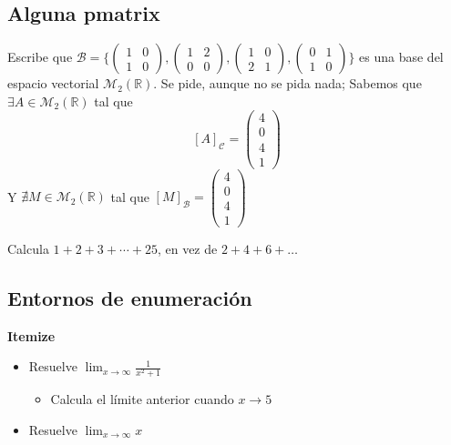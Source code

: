 \documentclass[10pt,a4paper]{article}
\begin{document}
\subsection{Alguna pmatrix}

Escribe que $\mathcal{B} = \{
	\begin{pmatrix}
		1 & 0 \\ 1 & 0
	\end{pmatrix},
	\begin{pmatrix}
		1 & 2 \\ 0 & 0
	\end{pmatrix},
	\begin{pmatrix}
		1 & 0 \\ 2 & 1
	\end{pmatrix},
	\begin{pmatrix}
		0 & 1 \\ 1 & 0
	\end{pmatrix}	
\}$ es una base del espacio vectorial $\mathcal{M}_2(\mathbb{R})$. Se pide, aunque no se pida nada;
Sabemos que $\exists A \in \mathcal{M}_2(\mathbb{R})$ tal que 
	\[[A]_{\mathcal{C}}=\begin{pmatrix} 
			4\\0\\4\\1
	\end{pmatrix}
	\]
	Y $\nexists M \in \mathcal{M}_2(\mathbb{R})$ tal que $[M]_{\mathcal{B}}=\begin{pmatrix}
		4\\0\\4\\1
	\end{pmatrix}$
\vspace{2cm}

Calcula $1+2+3+\cdots + 25$, en vez de $2+4+6+\dots$
\vspace{2cm}

\subsection*{Entornos de enumeración}
\textbf{Itemize}
\begin{itemize}
	\item Resuelve $\lim_{x\to \infty}\frac{1}{x^2+1}$
	\begin{itemize}
		\item Calcula el límite anterior cuando $x\to 5$
	\end{itemize} 
	\item Resuelve $\lim_{x\to \infty} x$
\end{itemize}
\end{document}
